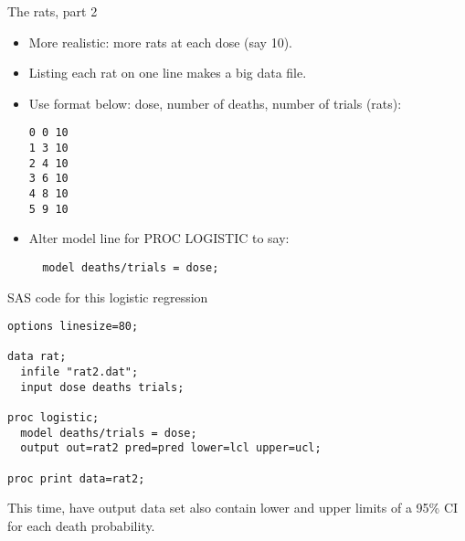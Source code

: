\documentclass[pdf]{prosper}
\begin{document}
\begin{slide}{The rats, part 2}

  \begin{itemize}
  \item More realistic: more rats at each dose (say 10).
  \item Listing each rat on one line makes a big data file.
  \item Use format below: dose, number of deaths, number of trials (rats):
\begin{verbatim}
0 0 10
1 3 10
2 4 10
3 6 10
4 8 10
5 9 10

\end{verbatim}
\item Alter model line for PROC LOGISTIC to say:
\begin{verbatim}
  model deaths/trials = dose;
\end{verbatim}

  \end{itemize}
  
\end{slide}

\begin{slide}{SAS code for this logistic regression}

\begin{verbatim}
options linesize=80;

data rat;
  infile "rat2.dat";
  input dose deaths trials;

proc logistic;
  model deaths/trials = dose;
  output out=rat2 pred=pred lower=lcl upper=ucl;

proc print data=rat2;

\end{verbatim}

\vspace{3ex}

This time, have output data set also contain lower and upper limits of a 95\% CI for each death probability.
  
\end{slide}
\end{document}
